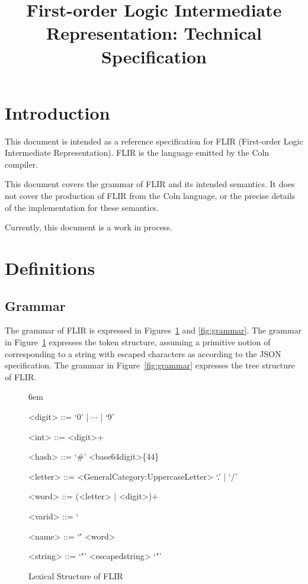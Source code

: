 \documentclass{scrartcl}
\title{First-order Logic Intermediate Representation: Technical Specification}
\begin{document}
\maketitle

\tableofcontents

\section{Introduction}

This document is intended as a reference specification for FLIR (First-order Logic Intermediate Representation). FLIR is the language emitted by the Coln compiler.

This document covers the grammar of FLIR and its intended semantics. It does not cover the production of FLIR from the Coln language, or the precise details of the implementation for these semantics.

Currently, this document is a work in process.

\section{Definitions}

\subsection{Grammar}

The grammar of FLIR is expressed in Figures~\ref{fig:lexical-structure} and \ref{fig:grammar}. The grammar in Figure~\ref{fig:lexical-structure} expresses the token structure, assuming a primitive notion of  corresponding to a string with escaped characters as according to the JSON specification. The grammar in Figure~\ref{fig:grammar} expresses the tree structure of FLIR.

\begin{figure}
  \grammarindent6em
  \begin{grammar}
    <digit> ::= `0' | $\cdots$ | `9'

    <int> ::= <digit>+

    <hash> ::= `#' <base64digit>\{44\}

    <letter> ::= <GeneralCategory:UppercaseLetter>
      \alt `.' | `/'

    <word> ::= (<letter> | <digit>)+

    <varid> ::= `%

    <name> ::= `\'' <word>

    <string> ::= `"' <escapedstring> `"'
  \end{grammar}
  \caption{Lexical Structure of FLIR}
  \label{fig:lexical-structure}
\end{figure}
\end{document}
